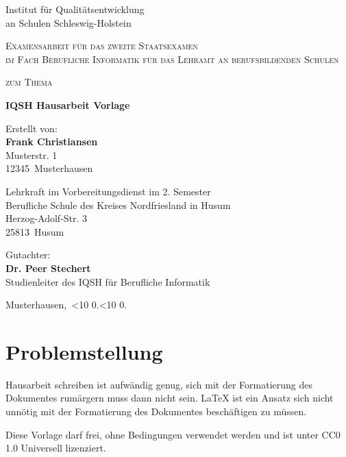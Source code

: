 \documentclass[a4paper, 12pt]{article}
\title{\haThema}
\author{\haAutor}
\date{\today}
\newcommand{\leadingzero}[1]{\ifnum #1<10 0\the#1\else\the#1\fi}
\newcommand{\datumVonHeute}{\leadingzero{\day}.\leadingzero{\month}.\the\year}
\newcommand{\haThema}{IQSH Hausarbeit Vorlage}
\newcommand{\haAutor}{Frank Christiansen}
\newcommand{\haAutorAdresse}{Musterstr. 1}
\newcommand{\haAutorPLZ}{12345}
\newcommand{\haAutorOrt}{Musterhausen}
\newcommand{\haDeckblattTextEins}{Examensarbeit für das zweite Staatsexamen\\ im Fach Berufliche Informatik für das Lehramt an berufsbildenden Schulen}
\newcommand{\haDeckblattTextZwei}{Lehrkraft im Vorbereitungsdienst im 2. Semester}
\newcommand{\haSchule}{Berufliche Schule des Kreises Nordfriesland in Husum}
\newcommand{\haSchuleAdresse}{Herzog-Adolf-Str. 3}
\newcommand{\haSchulePLZ}{25813}
\newcommand{\haSchuleOrt}{Husum}
\newcommand{\haGutachter}{Dr. Peer Stechert}
\newcommand{\haGutachterText}{Studienleiter des IQSH für Berufliche Informatik}
\begin{document}
\begin{titlepage}
Institut für Qualitätsentwicklung\\
an Schulen Schleswig-Holstein
\begin{center}
\vspace{1.5cm}
{\scshape\large \haDeckblattTextEins \par}
\vspace{1cm}
{\scshape\large zum Thema\par}
\vspace{1.5cm}
{\LARGE\bfseries \haThema \par}
\vfill
{Erstellt von:\\ {\bfseries \haAutor}\\ \haAutorAdresse\\ \haAutorPLZ~\haAutorOrt \par}
\vspace{1cm}
{\haDeckblattTextZwei \\ \haSchule \\ \haSchuleAdresse \\ \haSchulePLZ~\haSchuleOrt \par}
\vspace{1cm}
Gutachter:\\ {\bfseries \haGutachter}\\ \haGutachterText
\vfill
\end{center}
{\haAutorOrt,~\datumVonHeute\par}
\end{titlepage}
\thispagestyle{empty}
\newpage

\tableofcontents
\thispagestyle{empty}
\newpage

\setcounter{page}{1}



\section{Problemstellung}

Hausarbeit schreiben ist aufwändig genug, sich mit der Formatierung des Dokumentes rumärgern muss dann nicht sein. \LaTeX{} ist ein Ansatz sich nicht unnötig mit der Formatierung des Dokumentes beschäftigen zu müssen.

Diese Vorlage darf frei, ohne Bedingungen verwendet werden und ist unter CC0 1.0 Universell lizenziert.
\end{document}
